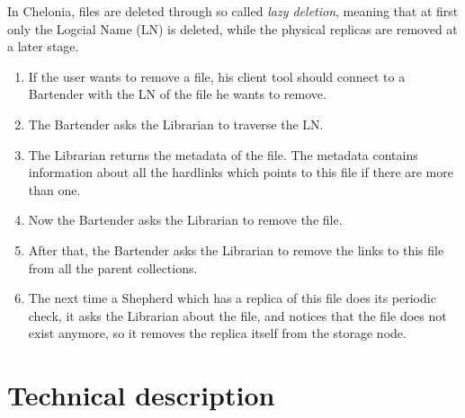 \documentclass{book}
\begin{document}
\begin{figure}[ht]
\end{figure}
In Chelonia, files are deleted through so called {\it lazy deletion}, meaning that at first only the Logcial Name (LN) is deleted, while the physical replicas are removed at a later stage.
\begin{enumerate}
    \item If the user wants to remove a file, his client tool should connect to a Bartender with the LN of the file he wants to remove.
    \item The Bartender asks the Librarian to traverse the LN.
    \item The Librarian returns the metadata of the file. The metadata contains information about all the hardlinks which points to this file if there are more than one.
    \item Now the Bartender asks the Librarian to remove the file.
    \item After that, the Bartender asks the Librarian to remove the links to this file from all the parent collections.
    \item The next time a Shepherd which has a replica of this file does its periodic check, it asks the Librarian about the file, and notices that the file does not exist anymore, so it removes the replica itself from the storage node.
\end{enumerate}



\chapter{Technical description} %
\label{cha:technical_description}
\end{document}

